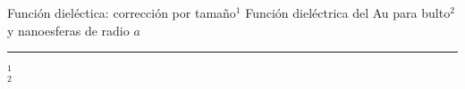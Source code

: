 \begin{frame}{Función dieléctica: corrección por tamaño$^1$}
{Función dieléctrica del Au para bulto$^2$ y nanoesferas de radio $a$}\small
 \begin{figure} \centering
\def\svgwidth{.7\textwidth}
\end{figure}
	\noindent\rule{.25\textwidth}{0.4pt}
 \begin{spacing}{0}\fontsize{4}{12} \selectfont
	$^1$ \\
	$^2$ 
	\end{spacing}
\end{frame}



